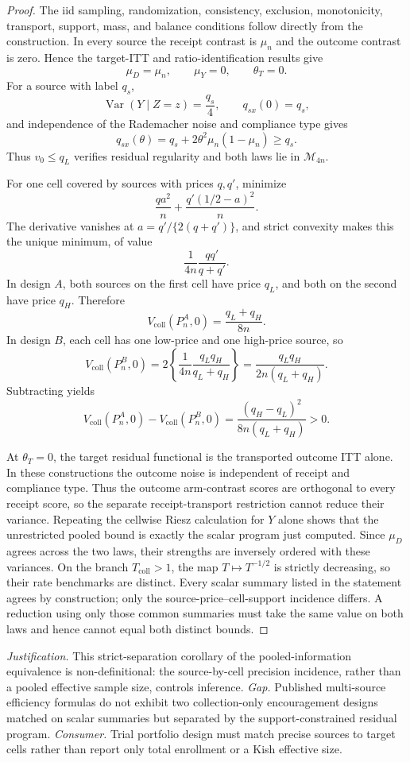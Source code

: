 \documentclass{article}
\begin{document}
\begin{proof}
The iid sampling, randomization, consistency, exclusion, monotonicity, transport, support, mass, and balance conditions follow directly from the construction. In every source the receipt contrast is \(\mu_n\) and the outcome contrast is zero. Hence the target-ITT and ratio-identification results give
\[
 \mu_D=\mu_n,\qquad \mu_Y=0,\qquad \theta_T=0.
\]
For a source with label \(q_s\),
\[
 \operatorname{Var}(Y\mid Z=z)=\frac{q_s}{4},
 \qquad
 q_{sx}(0)=q_s,
\]
and independence of the Rademacher noise and compliance type gives
\[
 q_{sx}(\theta)=q_s+2\theta^2\mu_n(1-\mu_n)\ge q_s.
\]
Thus \(v_0\le q_L\) verifies residual regularity and both laws lie in \(\mathcal M_{4n}\).

For one cell covered by sources with prices \(q,q'\), minimize
\[
 \frac{qa^2}{n}+\frac{q'(1/2-a)^2}{n}.
\]
The derivative vanishes at \(a=q'/\{2(q+q')\}\), and strict convexity makes this the unique minimum, of value
\[
 \frac1{4n}\frac{qq'}{q+q'}.
\]
In design \(A\), both sources on the first cell have price \(q_L\), and both on the second have price \(q_H\). Therefore
\[
 V_{\mathrm{coll}}(P_n^A,0)=\frac{q_L+q_H}{8n}.
\]
In design \(B\), each cell has one low-price and one high-price source, so
\[
 V_{\mathrm{coll}}(P_n^B,0)
 =2\left\{\frac1{4n}\frac{q_Lq_H}{q_L+q_H}\right\}
 =\frac{q_Lq_H}{2n(q_L+q_H)}.
\]
Subtracting yields
\[
 V_{\mathrm{coll}}(P_n^A,0)-V_{\mathrm{coll}}(P_n^B,0)
 =\frac{(q_H-q_L)^2}{8n(q_L+q_H)}>0.
\]

At \(\theta_T=0\), the target residual functional is the transported outcome ITT alone. In these constructions the outcome noise is independent of receipt and compliance type. Thus the outcome arm-contrast scores are orthogonal to every receipt score, so the separate receipt-transport restriction cannot reduce their variance. Repeating the cellwise Riesz calculation for \(Y\) alone shows that the unrestricted pooled bound is exactly the scalar program just computed. Since \(\mu_D\) agrees across the two laws, their strengths are inversely ordered with these variances. On the branch \(T_{\mathrm{coll}}>1\), the map \(T\mapsto T^{-1/2}\) is strictly decreasing, so their rate benchmarks are distinct. Every scalar summary listed in the statement agrees by construction; only the source-price--cell-support incidence differs. A reduction using only those common summaries must take the same value on both laws and hence cannot equal both distinct bounds.
\end{proof}
\par\smallskip\noindent \textit{Justification.} This strict-separation corollary of the pooled-information equivalence is non-definitional: the source-by-cell precision incidence, rather than a pooled effective sample size, controls inference. \textit{Gap.} Published multi-source efficiency formulas do not exhibit two collection-only encouragement designs matched on scalar summaries but separated by the support-constrained residual program. \textit{Consumer.} Trial portfolio design must match precise sources to target cells rather than report only total enrollment or a Kish effective size.
\end{document}
